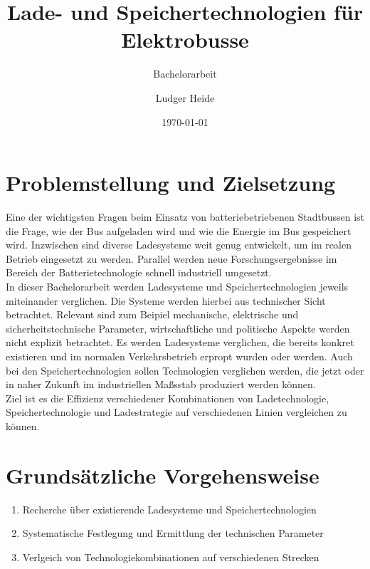 \documentclass{scrartcl}
\title{Lade- und Speichertechnologien für Elektrobusse}
\subtitle{Bachelorarbeit}
\date{\today}
\author{Ludger Heide}
\begin{document}

\maketitle


\section*{Problemstellung und Zielsetzung}
Eine der wichtigsten Fragen beim Einsatz von batteriebetriebenen Stadtbussen ist die Frage, wie der Bus aufgeladen wird und wie die Energie im Bus gespeichert wird. Inzwischen sind diverse Ladesysteme weit genug entwickelt, um im realen Betrieb eingesetzt zu werden. Parallel werden neue Forschungsergebnisse im Bereich der Batterietechnologie schnell industriell umgesetzt.\\
In dieser Bachelorarbeit werden Ladesysteme und Speichertechnologien jeweils miteinander verglichen. Die Systeme werden hierbei aus technischer Sicht betrachtet. Relevant sind zum Beipiel mechanische, elektrische und sicherheitstechnische Parameter, wirtschaftliche und politische Aspekte werden nicht explizit betrachtet. Es werden Ladesysteme verglichen, die bereits konkret existieren und im normalen Verkehrsbetrieb erpropt wurden oder werden. Auch bei den Speichertechnologien sollen Technologien verglichen werden, die jetzt oder in naher Zukunft im industriellen Maßsstab produziert werden können.\\
Ziel ist es die Effizienz verschiedener Kombinationen von Ladetechnologie, Speichertechnologie und Ladestrategie auf verschiedenen Linien vergleichen zu können.

\section*{Grundsätzliche Vorgehensweise}
\begin{enumerate}
	\item Recherche über existierende Ladesysteme und Speichertechnologien
	\item Systematische Festlegung und Ermittlung der technischen Parameter
	\item Verlgeich von Technologiekombinationen auf verschiedenen Strecken
\end{enumerate}


\end{document}
